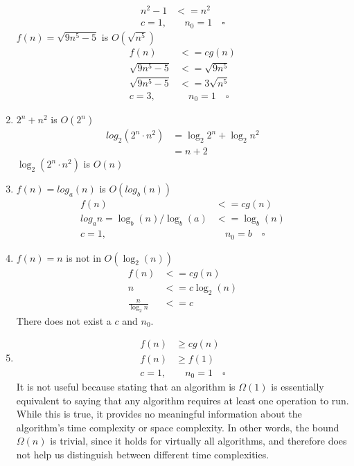\documentclass{book}
\begin{document}
\begin{enumerate}
\begin{align*}
      n^2 - 1 &<= n^2 \\
      c = 1, & \quad n_0 = 1 \quad \square
    \end{align*}
    $f(n) = \sqrt{9n^{5}-5}$ is $O(\sqrt{n^{5}})$
    \begin{align*}
      f(n) &<= cg(n) \\
      \sqrt{9n^5-5} &<= \sqrt{9n^5} \\
      \sqrt{9n^5-5} &<= 3\sqrt{n^5} \\
      c = 3, &\quad n_0 = 1 \quad \square
    \end{align*}
  \item $2^n + n^2$ is $O(2^n)$
    \begin{align*}
      log_{2}(2^{n} \cdot n^{2}) &= \log_{2}{2^{n}} + \log_{2}{n^{2}} \\
      &= n + 2
    \end{align*}
    $\log_{2}(2^{n} \cdot n^{2})$ is $O(n)$
  \item $f(n) = log_{a}(n)$ is $O(log_{b}(n))$
    \begin{align*}
      f(n) &<= cg(n) \\
      log_{a}n = \log_{b}(n)/\log_{b}(a) &<= \log_{b}(n) \\ 
      c = 1, &\quad n_0 = b \quad \square
    \end{align*}
  \item $f(n) = n$ is not in $O(\log_{2}(n))$
    \begin{align*}
      f(n) &<= cg(n) \\
      n &<= c\log_{2}(n) \\
      \frac{n}{\log_2{n}} &<= c
    \end{align*}
    There does not exist a $c$ and $n_0$.
  \item
    \begin{align*}
      f(n) &\ge cg(n) \\
      f(n) &\ge f(1) \\
      c = 1, &\quad n_0 = 1 \quad \square
    \end{align*}
    It is not useful because stating that an algorithm is $\Omega(1)$ is essentially equivalent to saying that any algorithm requires at least one operation to run. While this is true, it provides no meaningful information about the algorithm’s time complexity or space complexity. In other words, the bound $\Omega(n)$ is trivial, since it holds for virtually all algorithms, and therefore does not help us distinguish between different time complexities.
\end{enumerate}
\end{document}
